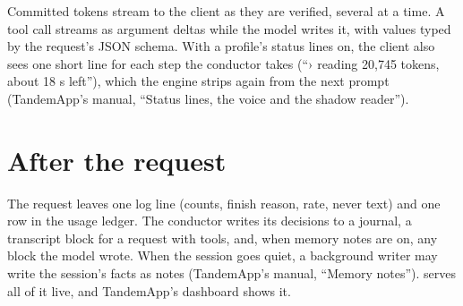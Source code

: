 Committed tokens stream to the client as they are verified, several at a time. A tool call streams as argument deltas while the model writes it, with values typed by the request's JSON schema. With a profile's status lines on, the client also sees one short line for each step the conductor takes (\enquote{› reading 20,745 tokens, about 18 s left}), which the engine strips again from the next prompt (TandemApp's manual, \enquote{Status lines, the voice and the shadow reader}).

\section{After the request}

The request leaves one log line (counts, finish reason, rate, never text) and one row in the usage ledger. The conductor writes its decisions to a journal, a transcript block for a request with tools, and, when memory notes are on, any  block the model wrote. When the session goes quiet, a background writer may write the session's facts as notes (TandemApp's manual, \enquote{Memory notes}).  serves all of it live, and TandemApp's dashboard shows it.
